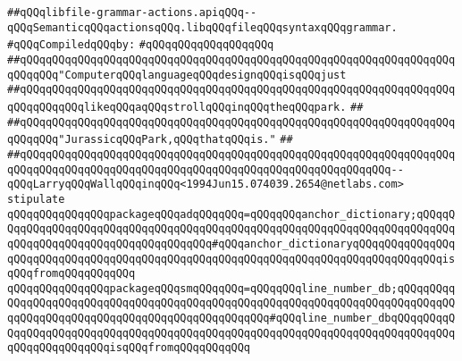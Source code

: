 \label{src/app/makelib/parse/libfile-grammar-actions.api}
\verb|##qQQqlibfile-grammar-actions.apiqQQq--qQQqSemanticqQQqactionsqQQq.libqQQqfileqQQqsyntaxqQQqgrammar.|\newline
\newline
\verb|#qQQqCompiledqQQqby:|\newline
\verb|#qQQqqQQqqQQqqQQqqQQq|\newline
\newline
\newline
\verb|##qQQqqQQqqQQqqQQqqQQqqQQqqQQqqQQqqQQqqQQqqQQqqQQqqQQqqQQqqQQqqQQqqQQqqQQqqQQq"ComputerqQQqlanguageqQQqdesignqQQqisqQQqjust|\newline
\verb|##qQQqqQQqqQQqqQQqqQQqqQQqqQQqqQQqqQQqqQQqqQQqqQQqqQQqqQQqqQQqqQQqqQQqqQQqqQQqqQQqlikeqQQqaqQQqstrollqQQqinqQQqtheqQQqpark.|\newline
\verb|##|\newline
\verb|##qQQqqQQqqQQqqQQqqQQqqQQqqQQqqQQqqQQqqQQqqQQqqQQqqQQqqQQqqQQqqQQqqQQqqQQqqQQq"JurassicqQQqPark,qQQqthatqQQqis."|\newline
\verb|##|\newline
\verb|##qQQqqQQqqQQqqQQqqQQqqQQqqQQqqQQqqQQqqQQqqQQqqQQqqQQqqQQqqQQqqQQqqQQqqQQqqQQqqQQqqQQqqQQqqQQqqQQqqQQqqQQqqQQqqQQqqQQqqQQqqQQqqQQq--qQQqLarryqQQqWallqQQqinqQQq<1994Jun15.074039.2654@netlabs.com>|\newline
\newline
\newline
\verb|stipulate|\newline
\verb|qQQqqQQqqQQqqQQqpackageqQQqadqQQqqQQq=qQQqqQQqanchor_dictionary;qQQqqQQqqQQqqQQqqQQqqQQqqQQqqQQqqQQqqQQqqQQqqQQqqQQqqQQqqQQqqQQqqQQqqQQqqQQqqQQqqQQqqQQqqQQqqQQqqQQqqQQqqQQq#qQQqanchor_dictionaryqQQqqQQqqQQqqQQqqQQqqQQqqQQqqQQqqQQqqQQqqQQqqQQqqQQqqQQqqQQqqQQqqQQqqQQqqQQqqQQqqQQqisqQQqfromqQQqqQQqqQQq|\newline
\verb|qQQqqQQqqQQqqQQqpackageqQQqsmqQQqqQQq=qQQqqQQqline_number_db;qQQqqQQqqQQqqQQqqQQqqQQqqQQqqQQqqQQqqQQqqQQqqQQqqQQqqQQqqQQqqQQqqQQqqQQqqQQqqQQqqQQqqQQqqQQqqQQqqQQqqQQqqQQqqQQqqQQqqQQq#qQQqline_number_dbqQQqqQQqqQQqqQQqqQQqqQQqqQQqqQQqqQQqqQQqqQQqqQQqqQQqqQQqqQQqqQQqqQQqqQQqqQQqqQQqqQQqqQQqqQQqqQQqisqQQqfromqQQqqQQqqQQq|\newline
